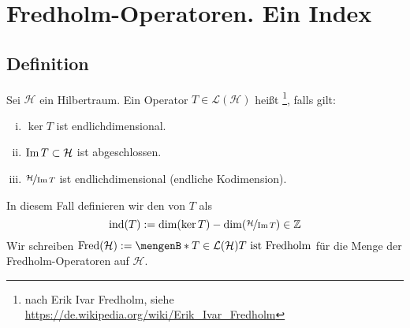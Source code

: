 \section{Fredholm-Operatoren. Ein Index} %
\label{sec:9}

\subsection[Definition: Fredholm-Operator und Fredholm-Index]{Definition} %
\label{sub:91}
Sei $\mathcal{H}$ ein Hilbertraum. Ein Operator $T \in \mathcal{L}(\mathcal{H})$ heißt \footnote{nach Erik Ivar Fredholm, siehe 
\url{https://de.wikipedia.org/wiki/Erik_Ivar_Fredholm}}, falls gilt:
\begin{enumerate}[(i)]
	\item $\ker T$ ist endlichdimensional.
	\item $\operatorname{Im} T \subset \mathcal{H}$ ist abgeschlossen.
	\item $\nicefrac{\mathcal{H}}{\operatorname{Im} T}$ ist endlichdimensional (endliche Kodimension).
\end{enumerate}
In diesem Fall definieren wir den  von $T$ als 
\[
	\operatorname{ind}(T) := \dim(\ker T) - \dim (\nicefrac{\mathcal{H}}{\operatorname{Im} T}) \in \mathbb{Z} 
\]
Wir schreiben $\Fred(\mathcal{H}) := \set[T \in \mathcal{L}(\mathcal{H})]{T \text{ ist Fredholm}}$ für die Menge der Fredholm-Operatoren auf $\mathcal{H}$.

